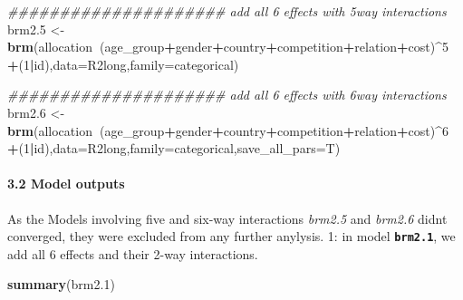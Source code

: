 \documentclass[
]{article}
\newenvironment{Shaded}{\begin{snugshade}}{\end{snugshade}}
\newcommand{\CommentTok}[1]{\textcolor[rgb]{0.56,0.35,0.01}{\textit{#1}}}
\newcommand{\DataTypeTok}[1]{\textcolor[rgb]{0.13,0.29,0.53}{#1}}
\newcommand{\DecValTok}[1]{\textcolor[rgb]{0.00,0.00,0.81}{#1}}
\newcommand{\FloatTok}[1]{\textcolor[rgb]{0.00,0.00,0.81}{#1}}
\newcommand{\KeywordTok}[1]{\textcolor[rgb]{0.13,0.29,0.53}{\textbf{#1}}}
\newcommand{\NormalTok}[1]{#1}
\newcommand{\OperatorTok}[1]{\textcolor[rgb]{0.81,0.36,0.00}{\textbf{#1}}}
\newcommand{\StringTok}[1]{\textcolor[rgb]{0.31,0.60,0.02}{#1}}
\begin{document}
\begin{Shaded}
\begin{Highlighting}[]
\CommentTok{##################### add all 6 effects with 5way interactions}
\NormalTok{brm2}\FloatTok{.5}\NormalTok{ <-}\StringTok{ }\KeywordTok{brm}\NormalTok{(allocation}\OperatorTok{~}\NormalTok{(age_group}\OperatorTok{+}\NormalTok{gender}\OperatorTok{+}\NormalTok{country}\OperatorTok{+}\NormalTok{competition}\OperatorTok{+}\NormalTok{relation}\OperatorTok{+}\NormalTok{cost)}\OperatorTok{^}\DecValTok{5}
              \OperatorTok{+}\NormalTok{(}\DecValTok{1}\OperatorTok{|}\NormalTok{id),}\DataTypeTok{data=}\NormalTok{R2long,}\DataTypeTok{family=}\NormalTok{categorical)}

\CommentTok{##################### add all 6 effects with 6way interactions}
\NormalTok{brm2}\FloatTok{.6}\NormalTok{ <-}\StringTok{ }\KeywordTok{brm}\NormalTok{(allocation}\OperatorTok{~}\NormalTok{(age_group}\OperatorTok{+}\NormalTok{gender}\OperatorTok{+}\NormalTok{country}\OperatorTok{+}\NormalTok{competition}\OperatorTok{+}\NormalTok{relation}\OperatorTok{+}\NormalTok{cost)}\OperatorTok{^}\DecValTok{6}
              \OperatorTok{+}\NormalTok{(}\DecValTok{1}\OperatorTok{|}\NormalTok{id),}\DataTypeTok{data=}\NormalTok{R2long,}\DataTypeTok{family=}\NormalTok{categorical,}\DataTypeTok{save_all_pars=}\NormalTok{T)}
\end{Highlighting}
\end{Shaded}

\hypertarget{model-outputs}{%
\paragraph{3.2 Model outputs}\label{model-outputs}}

As the Models involving five and six-way interactions \emph{brm2.5} and
\emph{brm2.6} didnt converged, they were excluded from any further
anylysis. 1: in model \textbf{\texttt{brm2.1}}, we add all 6 effects and
their 2-way interactions.

\begin{Shaded}
\begin{Highlighting}[]
\KeywordTok{summary}\NormalTok{(brm2}\FloatTok{.1}\NormalTok{) }
\end{Highlighting}
\end{Shaded}
\end{document}
